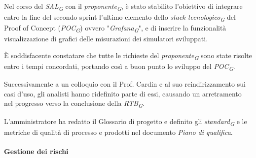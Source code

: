 Nel corso del \textit{SAL}\textsubscript{\textit{G}} con il \textit{proponente}\textsubscript{\textit{G}}, è stato stabilito l'obiettivo di integrare entro la fine del secondo sprint l'ultimo elemento dello \textit{stack tecnologico}\textsubscript{\textit{G}} del Proof of Concept (\textit{POC}\textsubscript{\textit{G}}) ovvero "\textit{Grafana}\textsubscript{\textit{G}}", e di inserire la funzionalità visualizzazione di grafici delle misurazioni dei simulatori sviluppati.

\vspace{0.2cm}

È soddisfacente constatare che tutte le richieste del \textit{proponente}\textsubscript{\textit{G}} sono state risolte entro i tempi concordati, portando così a buon punto lo sviluppo del \textit{POC}\textsubscript{\textit{G}}.

Successivamente a un colloquio con il Prof. Cardin e al suo reindirizzamento sui casi d'uso, gli analisti hanno ridefinito parte di essi, causando un arretramento nel progresso verso la conclusione della \textit{RTB}\textsubscript{\textit{G}}.

\vspace{0.2cm}

L'amministratore ha redatto il Glossario di progetto e definito gli \textit{standard}\textsubscript{\textit{G}} e le metriche di qualità di processo e prodotti nel documento \textit{Piano di qualifica}.

\paragraph{Gestione dei rischi} 

